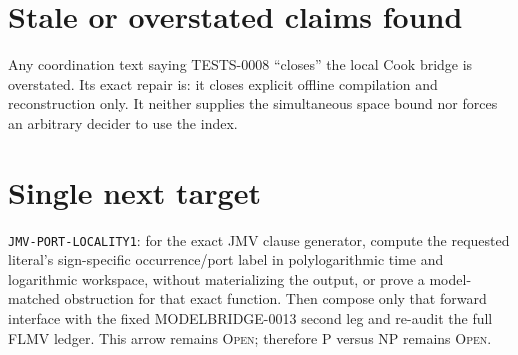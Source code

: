 \documentclass[11pt]{article}
\newcommand{\status}[1]{\textsc{#1}}
\begin{document}
\section{Stale or overstated claims found}

Any coordination text saying TESTS-0008 ``closes'' the local Cook bridge is
overstated.  Its exact repair is: it closes explicit offline compilation and
reconstruction only.  It neither supplies the simultaneous space bound nor
forces an arbitrary decider to use the index.

\section*{Single next target}

\texttt{JMV-PORT-LOCALITY1}: for the exact JMV clause generator, compute the
requested literal's sign-specific occurrence/port label in polylogarithmic
time and logarithmic workspace, without materializing the output, or prove a
model-matched obstruction for that exact function.  Then compose only that
forward interface with the fixed MODELBRIDGE-0013 second leg and re-audit the
full FLMV ledger.  This arrow remains \status{Open}; therefore P versus NP
remains \status{Open}.

\end{document}
